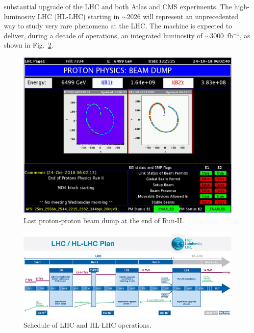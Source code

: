 substantial upgrade of the LHC and both Atlas and CMS experiments.
The high-luminosity LHC (HL-LHC) starting in $\sim$2026
will represent an unprecedented way to study very rare phenomena at the LHC. The
machine is expected to deliver, during a decade of operations, an integrated luminosity
of $\sim$3000~fb$^{-1}$, as shown in Fig.~\ref{lhcplan}.
\begin{figure}
\centering
\includegraphics[scale= 0.2]{../Cap2/beam}
\caption{Last proton-proton beam dump at the end of Run-II.}
\label{beam}
\end{figure}
\begin{figure}
\centering
\includegraphics[scale= 0.5]{../Cap2/lhcplan}
\caption{Schedule of LHC and HL-LHC operations.}
\label{lhcplan}
\end{figure}





